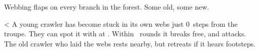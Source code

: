 \begin{boxtext}
  Webbing flaps on every branch in the forest.
  Some old, some new.
\end{boxtext}

\chitincrawler

\randomize%
\ifnum\thehp<\value{r12}
  A young \gls{crawler} has become stuck in its own webs just 0~\glspl{step} from the troupe.
  They can spot it with  at \tn[6].
  Within ~\glspl{round} it breaks free, and attacks.
\else
  The old \gls{crawler} who laid the webs rests nearby, but retreats if it hears footsteps.
\fi
